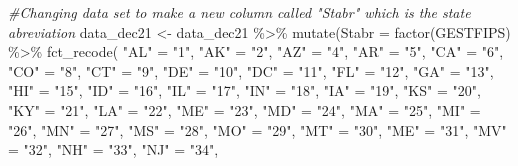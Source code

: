 \documentclass[
]{article}
\newenvironment{Shaded}{\begin{snugshade}}{\end{snugshade}}
\newcommand{\AttributeTok}[1]{\textcolor[rgb]{0.77,0.63,0.00}{#1}}
\newcommand{\CommentTok}[1]{\textcolor[rgb]{0.56,0.35,0.01}{\textit{#1}}}
\newcommand{\FunctionTok}[1]{\textcolor[rgb]{0.00,0.00,0.00}{#1}}
\newcommand{\NormalTok}[1]{#1}
\newcommand{\OtherTok}[1]{\textcolor[rgb]{0.56,0.35,0.01}{#1}}
\newcommand{\SpecialCharTok}[1]{\textcolor[rgb]{0.00,0.00,0.00}{#1}}
\newcommand{\StringTok}[1]{\textcolor[rgb]{0.31,0.60,0.02}{#1}}
\begin{document}
\begin{Shaded}
\begin{Highlighting}[]
\CommentTok{\#Changing data set to make a new column called "Stabr" which is the state abreviation}
\NormalTok{data\_dec21 }\OtherTok{\textless{}{-}}\NormalTok{ data\_dec21 }\SpecialCharTok{\%\textgreater{}\%}
                   \FunctionTok{mutate}\NormalTok{(}\AttributeTok{Stabr =} \FunctionTok{factor}\NormalTok{(GESTFIPS) }\SpecialCharTok{\%\textgreater{}\%}
                     \FunctionTok{fct\_recode}\NormalTok{( }
           \StringTok{"AL"} \OtherTok{=} \StringTok{"1"}\NormalTok{, }
           \StringTok{"AK"} \OtherTok{=} \StringTok{"2"}\NormalTok{, }
           \StringTok{"AZ"} \OtherTok{=} \StringTok{"4"}\NormalTok{,}
           \StringTok{"AR"} \OtherTok{=} \StringTok{"5"}\NormalTok{,}
           \StringTok{"CA"} \OtherTok{=} \StringTok{"6"}\NormalTok{,}
           \StringTok{"CO"} \OtherTok{=} \StringTok{"8"}\NormalTok{,}
           \StringTok{"CT"} \OtherTok{=} \StringTok{"9"}\NormalTok{,}
           \StringTok{"DE"} \OtherTok{=} \StringTok{"10"}\NormalTok{,}
           \StringTok{"DC"} \OtherTok{=} \StringTok{"11"}\NormalTok{,}
           \StringTok{"FL"} \OtherTok{=} \StringTok{"12"}\NormalTok{,}
           \StringTok{"GA"} \OtherTok{=} \StringTok{"13"}\NormalTok{,}
           \StringTok{"HI"} \OtherTok{=} \StringTok{"15"}\NormalTok{,}
           \StringTok{"ID"} \OtherTok{=} \StringTok{"16"}\NormalTok{,}
           \StringTok{"IL"} \OtherTok{=} \StringTok{"17"}\NormalTok{,}
           \StringTok{"IN"} \OtherTok{=} \StringTok{"18"}\NormalTok{,}
           \StringTok{"IA"} \OtherTok{=} \StringTok{"19"}\NormalTok{,}
           \StringTok{"KS"} \OtherTok{=} \StringTok{"20"}\NormalTok{,}
           \StringTok{"KY"} \OtherTok{=} \StringTok{"21"}\NormalTok{,}
           \StringTok{"LA"} \OtherTok{=} \StringTok{"22"}\NormalTok{,}
           \StringTok{"ME"} \OtherTok{=} \StringTok{"23"}\NormalTok{,}
           \StringTok{"MD"} \OtherTok{=} \StringTok{"24"}\NormalTok{,}
           \StringTok{"MA"} \OtherTok{=} \StringTok{"25"}\NormalTok{,}
           \StringTok{"MI"} \OtherTok{=} \StringTok{"26"}\NormalTok{,}
           \StringTok{"MN"} \OtherTok{=} \StringTok{"27"}\NormalTok{,}
           \StringTok{"MS"} \OtherTok{=} \StringTok{"28"}\NormalTok{,}
           \StringTok{"MO"} \OtherTok{=} \StringTok{"29"}\NormalTok{,}
           \StringTok{"MT"} \OtherTok{=} \StringTok{"30"}\NormalTok{,}
           \StringTok{"ME"} \OtherTok{=} \StringTok{"31"}\NormalTok{,}
           \StringTok{"MV"} \OtherTok{=} \StringTok{"32"}\NormalTok{,}
           \StringTok{"NH"} \OtherTok{=} \StringTok{"33"}\NormalTok{,}
           \StringTok{"NJ"} \OtherTok{=} \StringTok{"34"}\NormalTok{,}

\end{Highlighting}
\end{Shaded}
\end{document}
